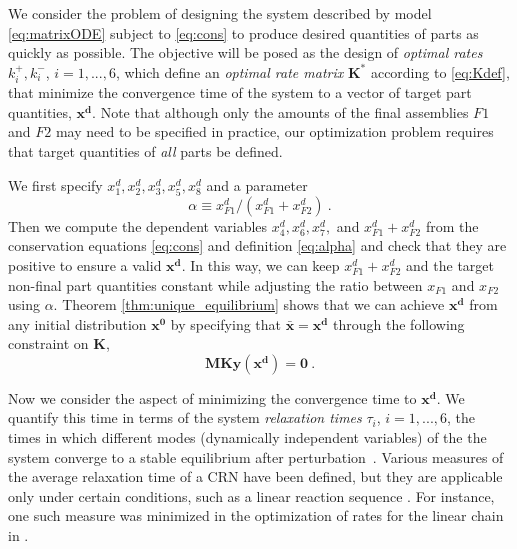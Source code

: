 We consider the problem of designing the system described by model
\eqref{eq:matrixODE} subject to \eqref{eq:cons} to produce desired
quantities of parts as quickly as possible. The objective will be
posed as the design of {\it optimal rates} $k_i^+, k_i^-$,
$i=1,...,6$, which define an {\it optimal rate matrix}
$\mathbf{K}^*$ according to \eqref{eq:Kdef}, that minimize the
convergence time of the system to a vector of target part
quantities, $\mathbf{x^d}$. Note that although only the amounts of
the final assemblies $F1$ and $F2$ may need to be specified in
practice, our optimization problem requires that target quantities
of {\it all} parts be defined.

We first specify $x_1^d, x_2^d, x_3^d, x_5^d, x_8^d$ and a parameter
\begin{equation}
\alpha \equiv x_{F1}^d/(x_{F1}^d+x_{F2}^d)~. \label{eq:alpha}
\end{equation}
Then we compute the dependent variables $x_4^d, x_6^d, x_7^d,$ and
$x_{F1}^d+x_{F2}^d$ from the conservation equations \eqref{eq:cons}
and definition \eqref{eq:alpha} and check that they are positive to
ensure a valid $\mathbf{x^d}$. In this way, we can keep
$x_{F1}^d+x_{F2}^d$ and the target non-final part quantities
constant while adjusting the ratio between $x_{F1}$ and $x_{F2}$
using $\alpha$.  Theorem \ref{thm:unique_equilibrium} shows that we
can achieve $\mathbf{x^d}$ from any initial distribution
$\mathbf{x^0}$ by specifying that $\mathbf{\bar{x}} = \mathbf{x^d}$
through the following constraint on $\mathbf{K}$,
\begin{equation}
\mathbf{M}\mathbf{K}\mathbf{y(x^d)} = \mathbf{0}~.
\label{eq:equilConstr}
\end{equation}




Now we consider the aspect of minimizing the convergence time to
$\mathbf{x^d}$.  We quantify this time in terms of the system {\it
relaxation times} $\tau_i$, $i=1,...,6$, the times in which
different modes (dynamically independent variables) of the the
system converge to a stable equilibrium after
perturbation~\cite{bib:Heinrich1977,bib:Jamshidi2008}.  Various
measures of the average relaxation time of a CRN have been defined,
but they are applicable only under certain conditions, such as a
linear reaction sequence \cite{bib:Heinrich1991}.  For instance, one
such measure was minimized in the optimization of rates for the
linear chain in \cite{Schuster:1987p11838}.

